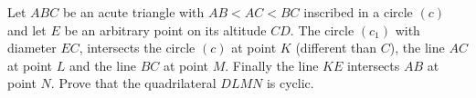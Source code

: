 Let $ABC$ be an acute triangle with $AB < AC < BC$ inscribed in a circle $(c)$ and let $E$ be an arbitrary point on its altitude $CD$. The circle $(c_1)$ with diameter $EC$, intersects the circle $(c)$ at point $K$ (different than $C$), the line $AC$ at point $L$ and the line $BC$ at point $M$. Finally the line $KE$ intersects $AB$ at point $N$. Prove that the quadrilateral $DLMN$ is cyclic.